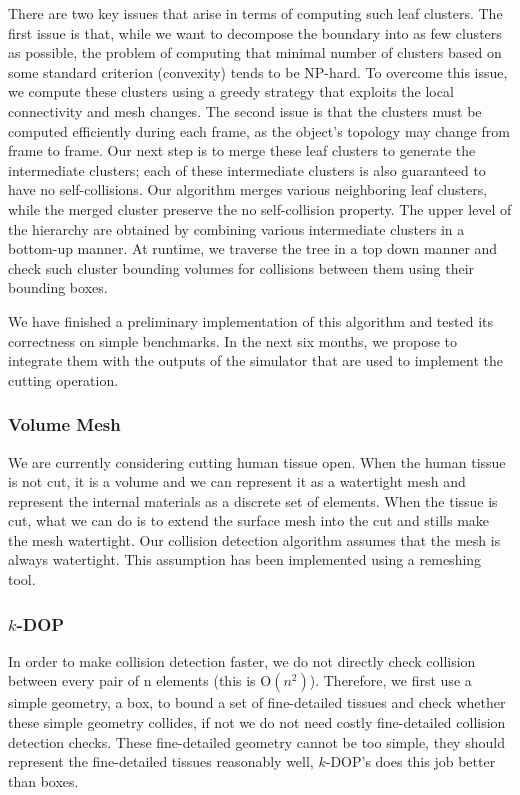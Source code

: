 There are two key issues that arise in terms of computing such leaf clusters. The first issue is that, while we want to decompose the boundary into as few clusters as possible, the problem of computing that minimal number of clusters based on some standard criterion (\eg convexity) tends to be NP-hard. To overcome this issue, we compute these clusters using a greedy strategy that exploits the local connectivity and mesh changes. The second issue is that the clusters must be computed efficiently during each frame, as the object’s topology may change from frame to frame. Our next step is to merge these leaf clusters to generate the intermediate clusters; each of these intermediate clusters is also guaranteed to have no self-collisions. Our algorithm merges various neighboring leaf clusters, while the merged cluster preserve the no self-collision property. The upper level of the hierarchy are obtained by combining various intermediate clusters in a bottom-up manner. At runtime, we traverse the tree in a top down manner and check such cluster bounding volumes for collisions between them using their bounding boxes.

We have finished a preliminary implementation of this algorithm and tested its correctness on simple benchmarks. In the next six months, we propose to integrate them with the outputs of the  simulator that are used to implement the cutting operation.

\subsubsection{Volume Mesh}\label{sssec:volume_mesh}
We are currently considering cutting human tissue open. When the human tissue is not cut, it is a volume and we can represent it as a watertight mesh and represent the internal materials as a discrete set of elements. When the tissue is cut, what we can do is to extend the surface mesh into the cut and stills make the mesh watertight. Our collision detection algorithm assumes that the mesh is always watertight. This assumption has been implemented using a remeshing tool.

\subsubsection{$k$-DOP}\label{sssec:kdop}
In order to make collision detection faster, we do not directly check collision between every pair of n elements (this is $\mathrm{O}(n^2)$).  Therefore, we first use a simple geometry, \eg a box, to bound a set of fine-detailed tissues and check whether these simple geometry collides, if not we do not need costly fine-detailed collision detection checks. These fine-detailed geometry cannot be too simple, they should represent the fine-detailed tissues reasonably well, $k$-DOP's does this job better than boxes.

